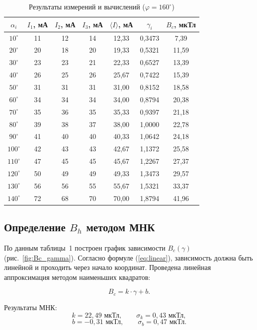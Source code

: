 \begin{table}[H]
\centering
\caption{Результаты измерений и вычислений ($\varphi = 160^\circ$)}
\small
\begin{tabular}{|c|c|c|c|c|c|c|}
\hline
$\alpha_i$ & $I_1$, мА & $I_2$, мА & $I_3$, мА & $\langle I \rangle$, мА & $\gamma_i$ & $B_c$, мкТл \\
\hline
$10^\circ$  & 11 & 12 & 14 & 12{,}33 & 0{,}3473 & 7{,}39 \\
$20^\circ$  & 20 & 18 & 20 & 19{,}33 & 0{,}5321 & 11{,}59 \\
$30^\circ$  & 23 & 23 & 21 & 22{,}33 & 0{,}6527 & 13{,}39 \\
$40^\circ$  & 26 & 25 & 26 & 25{,}67 & 0{,}7422 & 15{,}39 \\
$50^\circ$  & 31 & 31 & 31 & 31{,}00 & 0{,}8152 & 18{,}58 \\
$60^\circ$  & 34 & 34 & 34 & 34{,}00 & 0{,}8794 & 20{,}38 \\
$70^\circ$  & 35 & 36 & 35 & 35{,}33 & 0{,}9397 & 21{,}18 \\
$80^\circ$  & 39 & 38 & 37 & 38{,}00 & 1{,}0000 & 22{,}78 \\
$90^\circ$  & 41 & 40 & 40 & 40{,}33 & 1{,}0642 & 24{,}18 \\
$100^\circ$ & 42 & 43 & 43 & 42{,}67 & 1{,}1372 & 25{,}58 \\
$110^\circ$ & 47 & 45 & 45 & 45{,}67 & 1{,}2267 & 27{,}37 \\
$120^\circ$ & 50 & 49 & 49 & 49{,}33 & 1{,}3473 & 29{,}57 \\
$130^\circ$ & 56 & 56 & 55 & 55{,}67 & 1{,}5321 & 33{,}37 \\
$140^\circ$ & 72 & 68 & 70 & 70{,}00 & 1{,}8794 & 41{,}96 \\
\hline
\end{tabular}
\normalsize
\end{table}

\subsection{Определение $B_h$ методом МНК}

По данным таблицы~1 построен график зависимости $B_c(\gamma)$ (рис.~\ref{fig:Bc_gamma}). Согласно формуле (\ref{eq:linear}), зависимость должна быть линейной и проходить через начало координат. Проведена линейная аппроксимация методом наименьших квадратов:

\[
B_c = k \cdot \gamma + b.
\]

Результаты МНК:
\[
k = 22{,}49 \text{ мкТл}, \qquad \sigma_k = 0{,}43 \text{ мкТл},
\]
\[
b = -0{,}31 \text{ мкТл}, \qquad \sigma_b = 0{,}47 \text{ мкТл}.
\]

